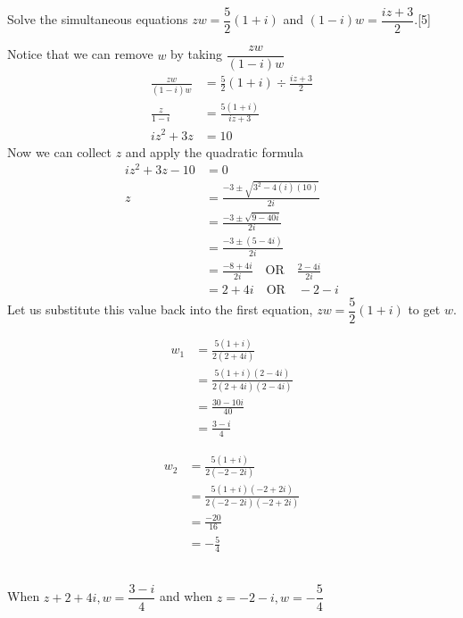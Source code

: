 \documentclass[12pt, a4 paper]{article}
\begin{document}
\begin{outline}[enumerate]
	\1 Solve the simultaneous equations $zw=\dfrac{5}{2}(1+i)$ and $(1-i)w=\dfrac{iz+3}{2}$.\hfill[5] %
	\begin{answer}
		Notice that we can remove $w$ by taking $\dfrac{zw}{(1-i)w}$
		\begin{align*}
			\frac{zw}{(1-i)w} & = \frac{5}{2}(1+i) \div \frac{iz+3}{2} \\
			\frac{z}{1-i}     & = \frac{5(1+i)}{iz+3}                  \\
			iz^2+3z           & = 10                                   
		\end{align*}
		Now we can collect $z$ and apply the quadratic formula
		\begin{align*}
			iz^2+3z-10 & = 0                                                      \\
			z          & = \frac{-3\pm\sqrt{3^2-4(i)(10)}}{2i}                    \\
			           & = \frac{-3\pm\sqrt{9-40i}}{2i}                           \\
			           & = \frac{-3\pm(5-4i)}{2i}                                 \\
			           & = \frac{-8+4i}{2i} \quad\textrm{OR}\quad \frac{2-4i}{2i} \\
			           & = 2+4i \quad\textrm{OR}\quad -2-i                        
		\end{align*}
		Let us substitute this value back into the first equation, $zw=\dfrac{5}{2}(1+i)$ to get $w$.\\
		\noindent
		\begin{minipage}{.3\textwidth}
			\begin{align*}
				w_1 & = \frac{5(1+i)}{2(2+4i)}             \\
				    & = \frac{5(1+i)(2-4i)}{2(2+4i)(2-4i)} \\ 
				    & = \frac{30-10i}{40}                  \\
				    & = \frac{3-i}{4}                      
			\end{align*}
		\end{minipage}%
		\begin{minipage}{.5\textwidth}
			\begin{align*}
				w_2 & = \frac{5(1+i)}{2(-2-2i)}               \\
				    & = \frac{5(1+i)(-2+2i)}{2(-2-2i)(-2+2i)} \\ 
				    & = \frac{-20}{16}                        \\
				    & = -\frac{5}{4}                          
			\end{align*}
		\end{minipage} \\
		When $z+2+4i, w=\dfrac{3-i}{4}$ and when $z=-2-i, w=-\dfrac{5}{4}$
	\end{answer}
		

\end{outline}
\end{document}
